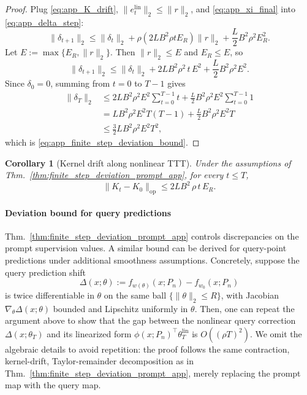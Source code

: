 \documentclass{article}
\theoremstyle{plain}
\newtheorem{corollary}[theorem]{Corollary}
\theoremstyle{definition}
\theoremstyle{remark}
\begin{document}
\begin{proof}
Plug \eqref{eq:app_K_drift}, $\|e_t^{\mathrm{lin}}\|_2\le \|r\|_2$, and \eqref{eq:app_xi_final} into \eqref{eq:app_delta_step}:
\[
\|\delta_{t+1}\|_2
\le
\|\delta_t\|_2
+
\rho  (2LB^2\rho t E_R)  \|r\|_2
+
\frac{L}{2}B^2\rho^2 E_R^2.
\]
Let $E:=\max\{E_R,\|r\|_2\}$. Then $\|r\|_2\le E$ and $E_R\le E$, so
\[
\|\delta_{t+1}\|_2
\le
\|\delta_t\|_2
+
2LB^2\rho^2\,t\,E^2
+
\frac{L}{2}B^2\rho^2 E^2.
\]
Since $\delta_0=0$, summing from $t=0$ to $T-1$ gives
\begin{align*}
    \|\delta_T\|_2 &\le 2LB^2\rho^2 E^2 \sum_{t=0}^{T-1} t + \frac{L}{2}B^2\rho^2 E^2 \sum_{t=0}^{T-1} 1 \\
    &= LB^2\rho^2 E^2 T(T-1) + \frac{L}{2}B^2\rho^2 E^2 T \\
    &\le \frac{3}{2}LB^2\rho^2 E^2 T^2,
\end{align*}
which is \eqref{eq:app_finite_step_deviation_bound}.
\end{proof}

\begin{corollary}[Kernel drift along nonlinear TTT]
\label{cor:kernel_drift_app}
Under the assumptions of Thm.~\ref{thm:finite_step_deviation_prompt_app}, for every $t\le T$,
\begin{equation}
\|K_t-K_0\|_{\mathrm{op}}\le 2LB^2\,\rho\,t\,E_R.
\label{eq:app_kernel_drift_cor}
\end{equation}
\end{corollary}



\paragraph{Deviation bound for query predictions}
Thm.~\ref{thm:finite_step_deviation_prompt_app} controls discrepancies on the prompt supervision values. A similar bound can be derived for query-point predictions under additional smoothness assumptions. Concretely, suppose the query prediction shift
\[
    \Delta(x;\theta):=f_{w(\theta)}(x;P_n)-f_{w_0}(x;P_n)
\]
is twice differentiable in $\theta$ on the same ball $\{\|\theta\|_2\le R\}$, with Jacobian $\nabla_\theta \Delta(x;\theta)$ bounded and Lipschitz uniformly in $\theta$. Then, one can repeat the argument above to show that the gap between the nonlinear query correction $\Delta(x;\theta_T)$ and its linearized form $\phi(x;P_n)^\top\theta_T^{\mathrm{lin}}$ is $O((\rho T)^2)$. We omit the algebraic details to avoid repetition: the proof follows the same contraction, kernel-drift, Taylor-remainder decomposition as in Thm.~\ref{thm:finite_step_deviation_prompt_app}, merely replacing the prompt map with the query map.
\end{document}
